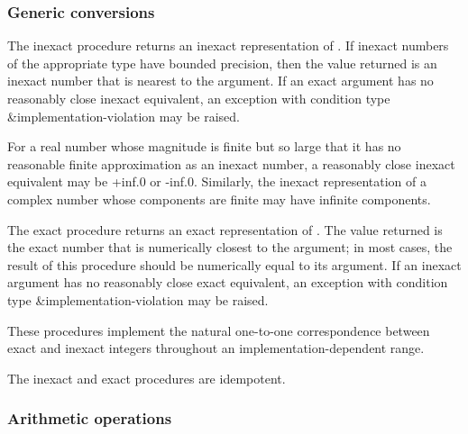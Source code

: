 \subsubsection{Generic conversions}

\begin{entry}{%
}

The {\cf inexact} procedure returns an inexact representation of .  If
inexact numbers of the appropriate type have bounded precision, then
the value returned is an inexact number that is nearest to the
argument.  If an exact argument has no reasonably close inexact
equivalent, an exception with condition type
{\cf\&implementation-violation} may be
raised.

\begin{note}
  For a real number whose magnitude is finite but so large that it has
  no reasonable finite approximation as an inexact number, a
  reasonably close inexact equivalent may be {\cf +inf.0} or {\cf
    -inf.0}.  Similarly, the inexact representation of a complex
  number whose components are finite may have infinite components.
\end{note}

The {\cf exact} procedure returns an exact representation of .  The value
returned is the exact number that is numerically closest to the
argument; in most cases, the result of this procedure should be
numerically equal to its argument.  If an inexact argument has no
reasonably close exact equivalent, an exception with condition type
{\cf\&implementation-violation} may be
raised.

These procedures implement the natural one-to-one correspondence
between exact and inexact integers throughout an
implementation-dependent range.

The {\cf inexact} and {\cf exact} procedures are idempotent.
\end{entry}

\subsubsection{Arithmetic operations}

